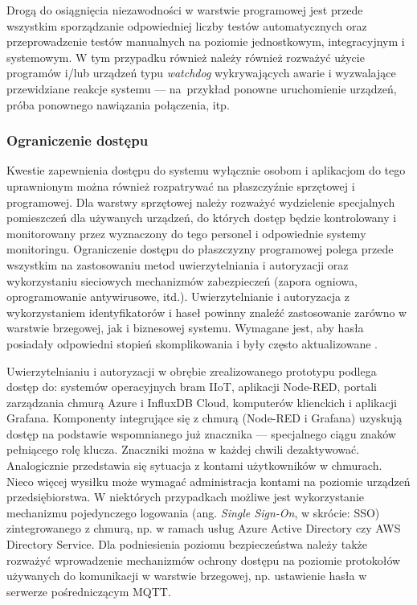 \documentclass[a4paper, 12pt, twoside]{article}
\begin{document}
Drogą do osiągnięcia niezawodności w warstwie programowej jest przede wszystkim sporządzanie
odpowiedniej liczby testów automatycznych oraz przeprowadzenie testów manualnych
na poziomie jednostkowym, integracyjnym i systemowym.
W tym przypadku również należy również rozważyć użycie programów i/lub urządzeń typu \emph{watchdog}
wykrywających awarie i wyzwalające przewidziane reakcje systemu ---
na~przykład ponowne uruchomienie urządzeń, próba ponownego nawiązania połączenia, itp.

\subsubsection{Ograniczenie dostępu}

Kwestie zapewnienia dostępu do systemu wyłącznie osobom i aplikacjom do tego
uprawnionym można również rozpatrywać na płaszczyźnie sprzętowej i programowej.
Dla warstwy sprzętowej należy rozważyć wydzielenie specjalnych pomieszczeń
dla używanych urządzeń, do których dostęp będzie kontrolowany i monitorowany
przez wyznaczony do tego personel i odpowiednie systemy monitoringu.
Ograniczenie dostępu do płaszczyzny programowej polega przede wszystkim na zastosowaniu
metod uwierzytelniania i autoryzacji oraz wykorzystaniu sieciowych mechanizmów zabezpieczeń
(zapora ogniowa, oprogramowanie antywirusowe, itd.). Uwierzytelnianie i autoryzacja z wykorzystaniem
identyfikatorów i haseł powinny znaleźć zastosowanie zarówno w warstwie brzegowej,
jak i biznesowej systemu. Wymagane jest, aby hasła posiadały odpowiedni stopień skomplikowania
i były często aktualizowane \cite{situation-aware-iot-gateway}.

Uwierzytelnianiu i autoryzacji w obrębie zrealizowanego prototypu podlega dostęp do: systemów operacyjnych
bram IIoT, aplikacji Node-RED, portali zarządzania chmurą Azure i InfluxDB Cloud,
komputerów klienckich i aplikacji Grafana. Komponenty integrujące się z chmurą
(Node-RED i Grafana) uzyskują dostęp na podstawie wspomnianego już znacznika ---
specjalnego ciągu znaków pełniącego rolę klucza. Znaczniki można w każdej
chwili dezaktywować. Analogicznie przedstawia się
sytuacja z kontami użytkowników w chmurach. Nieco więcej wysiłku może wymagać
administracja kontami na poziomie urządzeń przedsiębiorstwa. W niektórych
przypadkach możliwe jest wykorzystanie mechanizmu pojedynczego logowania
(ang. \emph{Single Sign-On}, w skrócie: SSO) zintegrowanego z chmurą, np.
w ramach usług Azure Active Directory czy AWS Directory Service.
Dla podniesienia poziomu bezpieczeństwa należy także rozważyć wprowadzenie
mechanizmów ochrony dostępu na poziomie protokołów używanych do komunikacji
w warstwie brzegowej, np. ustawienie hasła w serwerze pośredniczącym MQTT.
\end{document}
